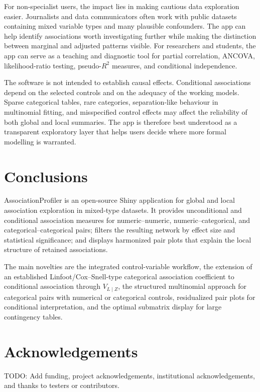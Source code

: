 \documentclass[preprint,12pt,a4paper]{elsarticle}
\numberwithin{equation}{section}
\begin{document}
For non-specialist users, the impact lies in making cautious data exploration easier. Journalists and data communicators often work with public datasets containing mixed variable types and many plausible confounders. The app can help identify associations worth investigating further while making the distinction between marginal and adjusted patterns visible. For researchers and students, the app can serve as a teaching and diagnostic tool for partial correlation, ANCOVA, likelihood-ratio testing, pseudo-$R^2$ measures, and conditional independence.

The software is not intended to establish causal effects. Conditional associations depend on the selected controls and on the adequacy of the working models. Sparse categorical tables, rare categories, separation-like behaviour in multinomial fitting, and misspecified control effects may affect the reliability of both global and local summaries. The app is therefore best understood as a transparent exploratory layer that helps users decide where more formal modelling is warranted.

\section{Conclusions}

AssociationProfiler is an open-source Shiny application for global and local association exploration in mixed-type datasets. It provides unconditional and conditional association measures for numeric--numeric, numeric--categorical, and categorical--categorical pairs; filters the resulting network by effect size and statistical significance; and displays harmonized pair plots that explain the local structure of retained associations.

The main novelties are the integrated control-variable workflow, the extension of an established Linfoot/Cox--Snell-type categorical association coefficient to conditional association through $V_{L\mid Z}$, the structured multinomial approach for categorical pairs with numerical or categorical controls, residualized pair plots for conditional interpretation, and the optimal submatrix display for large contingency tables.

\section*{Acknowledgements}

TODO: Add funding, project acknowledgements, institutional acknowledgements, and thanks to testers or contributors.
\end{document}
